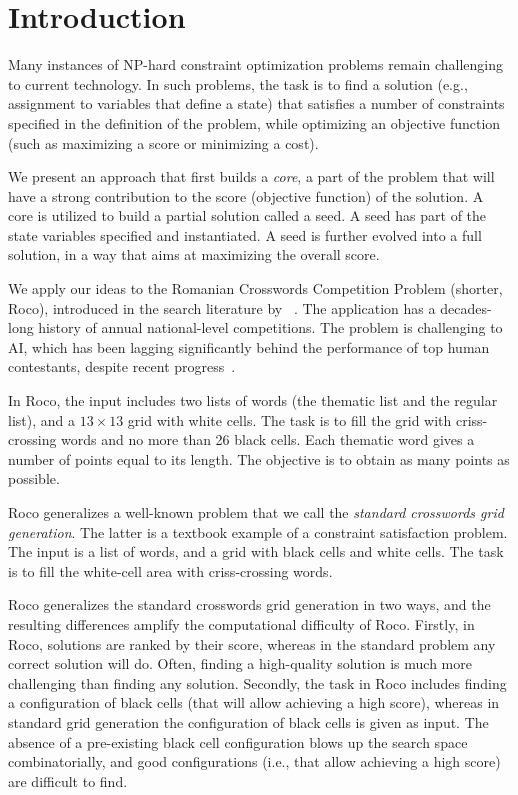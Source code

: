 \section{Introduction}
\label{sec::intro}

Many instances of NP-hard constraint optimization problems
remain challenging to current technology.
In such problems, the task is to find a solution
(e.g., assignment to variables that define a state) 
that satisfies a number of constraints specified in the definition
of the problem, while optimizing an objective function
(such as maximizing a score or minimizing a cost).


We present an approach that first builds a \emph{core},
a part of the problem that will have a strong contribution
to the score (objective function) of the solution.
A core is utilized to build a partial solution called a seed.
A seed has part of the state variables specified and instantiated.
A seed is further evolved into a full solution, in a way that aims
at maximizing the overall score.

We apply our ideas to the Romanian Crosswords Competition Problem (shorter, {\sc Roco}),
introduced in the search literature by
\citeauthor{DBLP:conf/socs/BoteaB21}~.
The application has a decades-long history of annual national-level competitions.
The problem is challenging to AI, which has been lagging significantly
behind the performance of top human contestants,
despite recent progress~\cite{DBLP:conf/socs/BoteaB21,DBLP:conf/cig/BulitkoB21,Botea_Bulitko_2022}.

In {\sc Roco}, the input includes two lists of words (the thematic list and the regular list),
and a $13 \times 13$ grid with white cells.
The task is to fill the grid with criss-crossing words and no more than 26 black cells.
Each thematic word gives a number of points equal to its length. The objective
is to obtain as many points as possible.

{\sc Roco} generalizes a well-known problem that we
call the \emph{standard crosswords grid generation}.
The latter is a textbook example of a constraint satisfaction problem.
The input is a list of words, and a grid with black cells and white cells.
The task is to fill the white-cell area with criss-crossing words.

{\sc Roco} generalizes the standard crosswords grid generation in two ways,
and the resulting differences amplify the computational difficulty of {\sc Roco}.
Firstly, in {\sc Roco}, solutions are ranked by their score,
whereas in the standard problem any correct solution will do.
Often, finding a high-quality solution is much more challenging than finding any solution.
Secondly, the task in {\sc Roco} includes finding a configuration of black cells
(that will allow achieving a high score), whereas in standard grid
generation the configuration of black cells is given as input.
The absence of a pre-existing black cell configuration
blows up the search space combinatorially, and good configurations
(i.e., that allow achieving a high score) are difficult to find.

